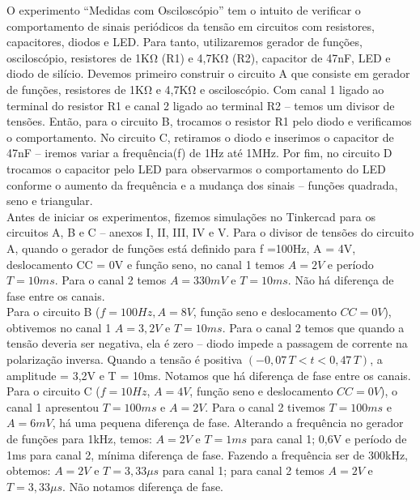 \documentclass[a4paper, 11pt]{article}
\begin{document}

O experimento “Medidas com Osciloscópio” tem o intuito de verificar o comportamento de sinais periódicos da tensão em circuitos com resistores, capacitores, diodos e LED. 
Para tanto, utilizaremos gerador de funções, osciloscópio, resistores de 1KΩ (R1) e 4,7KΩ (R2), capacitor de 47nF, LED e diodo de silício. Devemos primeiro construir o circuito A que consiste em gerador de funções, resistores de 1KΩ e 4,7KΩ e osciloscópio. 
Com canal 1 ligado ao terminal do resistor R1 e canal 2 ligado ao terminal R2 – temos um divisor de tensões. Então, para o circuito B, trocamos o resistor R1 pelo diodo e verificamos o comportamento. 
No circuito C, retiramos o diodo e inserimos o capacitor de 47nF – iremos variar a frequência(f) de 1Hz até 1MHz. 
Por fim, no circuito D trocamos o capacitor pelo LED para observarmos o comportamento do LED conforme o aumento da frequência e a mudança dos sinais – funções quadrada, seno e triangular.\\

Antes de iniciar os experimentos, fizemos simulações no Tinkercad para os circuitos A, B e C – anexos I, II, III, IV e V. 
Para o divisor de tensões do circuito A, quando o gerador de funções está definido para f =100Hz, A = 4V, deslocamento CC = 0V e função seno, no canal 1 temos $A = 2V$ e período $T = 10ms$. Para o canal 2 temos $A = 330mV$ e $T = 10ms$. Não há diferença de fase entre os canais.\\

Para o circuito B ($f = 100Hz, A = 8V$, função seno e deslocamento $CC = 0V$), obtivemos no canal 1 $A = 3,2V$ e  $T = 10ms$. 
Para o canal 2 temos que quando a tensão deveria ser negativa, ela é zero – diodo impede a passagem de corrente na polarização inversa.
Quando a tensão é positiva $(-0,07 \, T < t < 0,47 \, T)$, a amplitude = 3,2V e T = 10ms. 
Notamos que há diferença de fase entre os canais.\\

Para o circuito C ($f = 10Hz$, $A = 4V$, função seno e deslocamento $CC = 0V$), o canal 1 apresentou $T = 100ms$ e $A = 2V$. 
Para o canal 2 tivemos $T = 100ms$ e $A = 6mV$, há uma pequena diferença de fase. Alterando a frequência no gerador de funções para 1kHz, temos: $A = 2V$ e $T = 1ms$ para canal 1; 0,6V e período de 1ms para canal 2, mínima diferença de fase. 
Fazendo a frequência ser de 300kHz, obtemos: $A = 2V$ e $T = 3,33\mu s$ para canal 1; para canal 2 temos $A = 2V$ e $T = 3,33\mu s$. 
Não notamos diferença de fase.\\
\end{document}

